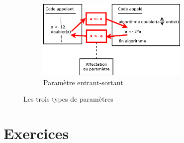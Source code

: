 \begin{center}
\begin{figure}
\begin{centering}
    \begin{subfigure}[b]{0.8\textwidth}
	\includegraphics[width=0.8\textwidth]{image/figure-parametres-entrant-sortants}
        \caption{Paramètre entrant-sortant}
        \label{fig:gull}
    \end{subfigure}
\par\end{centering}

\protect\caption{\label{fig:parametres}Les trois types de paramètres}
\end{figure}
\end{center}

\clearpage{}


\section{Exercices}

